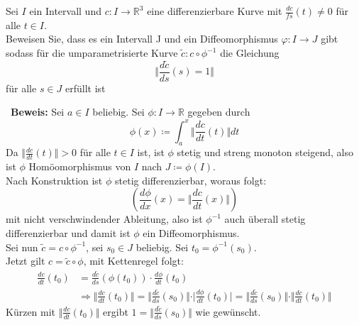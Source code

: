 \begin{assignment}
  Sei \( I \) ein Intervall und \( c: I \to \mathbb{R}^3 \) eine differenzierbare Kurve mit \( \frac{dc}{fs}(t) \neq 0 \) für alle \( t \in I \). \\
  Beweisen Sie, dass es ein Intervall J und ein Diffeomorphismus \( \varphi : I \to J \) gibt sodass für die umparametrisierte Kurve \( \tilde{c}: c \circ \phi^{-1} \) die Gleichung 
  \begin{equation*}
    \Vert \frac{d\tilde{c}}{ds}(s) = 1 \Vert
  \end{equation*}
  für alle \( s \in J \) erfüllt ist
\end{assignment}
\begin{solution}
  \
  \textbf{Beweis:} Sei \( a \in I \) beliebig. Sei \( \phi: I \to \mathbb{R} \) gegeben durch 
  \begin{equation*}
    \phi(x) \coloneqq \int_a^x { \Vert \frac{dc}{dt}(t) \Vert}dt
  \end{equation*}
  Da \( \Vert \frac{dc}{dt}(t) \Vert > 0 \) für alle \( t \in I \) ist, ist \( \phi \) stetig und streng monoton steigend, also ist \( \phi \) Homöomorphismus von \( I \) nach \( J \coloneqq \phi (I) \). \\
  Nach Konstruktion ist \( \phi \) stetig differenzierbar, woraus folgt:
  \begin{equation*}
    \left(\frac{d \phi}{dx}(x) = \Vert \frac{dc}{dt}(x) \Vert\right)
  \end{equation*}
  mit nicht verschwindender Ableitung, also ist \( \phi^{-1} \) auch überall stetig differenzierbar und damit ist \( \phi \) ein Diffeomorphismus. \\
  Sei nun \( \tilde{c} = c \circ \phi^{-1} \), sei \( s_0 \in J \) beliebig. Sei \( t_0 = \phi^{-1}(s_0) \). \\
  Jetzt gilt \( c = \tilde{c} \circ \phi \), mit Kettenregel folgt:
  \begin{align*}
    \frac{dc}{dt}(t_0) &= \frac{d \tilde{c}}{ds}(\phi(t_0))\cdot \frac{d \phi}{dt}(t_0) \\
    &\Rightarrow \Vert \frac{dc}{dt}(t_0)\Vert = \Vert \frac{d \tilde{c}}{ds}(s_0) \Vert \cdot \vert \frac{d \phi}{dt}(t_0) \vert = \Vert \frac{d \tilde{c}}{ds}(s_0) \Vert \cdot \Vert \frac{dc}{dt}(t_0) \Vert
  \end{align*}
  Kürzen mit \( \Vert \frac{dc}{dt} (t_0) \Vert \) ergibt \( 1 = \Vert \frac{d \tilde{c}}{ds}(s_0) \Vert \) wie gewünscht. \\
\end{solution}

